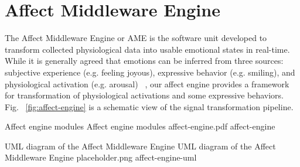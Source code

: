 
\section{Affect Middleware Engine}

The Affect Middleware Engine or AME is the software unit developed to transform collected physiological data into usable emotional states in real-time. While it is generally agreed that emotions can be inferred from three sources: subjective experience (e.g. feeling joyous), expressive behavior (e.g. smiling), and physiological activation (e.g. arousal) ~\cite{scherer1993neuroscience}, our affect engine provides a framework for transformation of physiological activations and some expressive behaviors. Fig. ~\ref{fig:affect-engine} is a schematic view of the signal transformation pipeline.

\img
{Affect engine modules}
{Affect engine modules}
{affect-engine.pdf}
{affect-engine}

\largeimg
{UML diagram of the Affect Middleware Engine}
{UML diagram of the Affect Middleware Engine}
{placeholder.png}
{affect-engine-uml}

